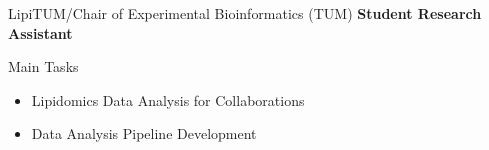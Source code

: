 {%
	LipiTUM/Chair of Experimental Bioinformatics (TUM)
}
{%
	\textbf{Student Research Assistant}
}
{%
	\vspace*{.3cm}
	Main Tasks
	\begin{itemize}
		\item Lipidomics Data Analysis for Collaborations
		\item Data Analysis Pipeline Development
	\end{itemize}
}
